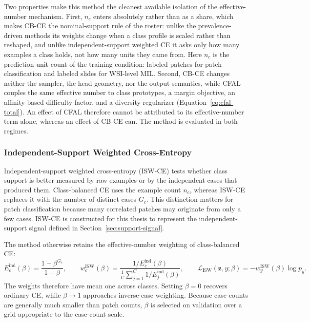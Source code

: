 \documentclass[11pt]{article}
\begin{document}
Two properties make this method the cleanest available isolation of the effective-number mechanism. First, $n_c$ enters absolutely rather than as a share, which makes CB-CE the nominal-support rule of the roster: unlike the prevalence-driven methods its weights change when a class profile is scaled rather than reshaped, and unlike independent-support weighted CE it asks only how many examples a class holds, not how many units they came from. Here $n_c$ is the prediction-unit count of the training condition: labeled patches for patch classification and labeled slides for WSI-level MIL. Second, CB-CE changes neither the sampler, the head geometry, nor the output semantics, while CFAL couples the same effective number to class prototypes, a margin objective, an affinity-based difficulty factor, and a diversity regularizer (Equation~\eqref{eq:cfal-total}). An effect of CFAL therefore cannot be attributed to its effective-number term alone, whereas an effect of CB-CE can. The method is evaluated in both regimes.

\subsubsection{Independent-Support Weighted Cross-Entropy}
\label{sec:isw-ce}
Independent-support weighted cross-entropy (ISW-CE) tests whether class support is better measured by raw examples or by the independent cases that produced them. Class-balanced CE uses the example count $n_c$, whereas ISW-CE replaces it with the number of distinct cases $G_c$. This distinction matters for patch classification because many correlated patches may originate from only a few cases. ISW-CE is constructed for this thesis to represent the independent-support signal defined in Section~\ref{sec:support-signal}.

The method otherwise retains the effective-number weighting of class-balanced CE:
\begin{equation}
  E_c^{\mathrm{ind}}(\beta)=\frac{1-\beta^{G_c}}{1-\beta},
  \qquad
  w_c^{\mathrm{ISW}}(\beta)=
  \frac{1/E_c^{\mathrm{ind}}(\beta)}
       {\frac{1}{C}\sum_{j=1}^{C}1/E_j^{\mathrm{ind}}(\beta)},
  \qquad
  \mathcal{L}_{\mathrm{ISW}}(\mathbf z,y;\beta)
  =-w_y^{\mathrm{ISW}}(\beta)\log p_y.
  \label{eq:isw-ce}
\end{equation}
\noindent The weights therefore have mean one across classes. Setting $\beta=0$ recovers ordinary CE, while $\beta\rightarrow1$ approaches inverse-case weighting. Because case counts are generally much smaller than patch counts, $\beta$ is selected on validation over a grid appropriate to the case-count scale.
\end{document}
